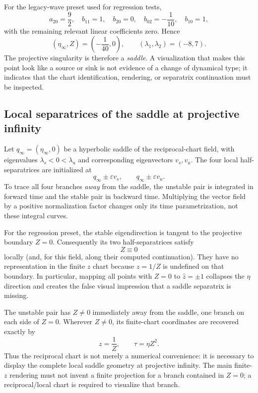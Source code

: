For the legacy-wave preset used for regression tests,
\[
a_{20}=\frac92,\quad b_{11}=1,\quad b_{20}=0,\quad
b_{02}=-\frac1{10},\quad b_{10}=1,
\]
with the remaining relevant linear coefficients zero.  Hence
\[
\boxed{(\eta_\infty,Z)=\left(-\frac1{40},0\right)},
\qquad
\boxed{(\lambda_1,\lambda_2)=(-8,7)}.
\]
The projective singularity is therefore a \emph{saddle}.  A visualization
that makes this point look like a source or sink is not evidence of a
change of dynamical type; it indicates that the chart identification,
rendering, or separatrix continuation must be inspected.

\subsection{Local separatrices of the saddle at projective infinity}

Let $q_\infty=(\eta_\infty,0)$ be a hyperbolic saddle of the reciprocal-chart
field, with eigenvalues $\lambda_s<0<\lambda_u$ and corresponding eigenvectors
$v_s,v_u$.  The four local half-separatrices are initialized at
\[
q_\infty\pm\varepsilon v_s,
\qquad
q_\infty\pm\varepsilon v_u.
\]
To trace all four branches \emph{away} from the saddle, the unstable pair is
integrated in forward time and the stable pair in backward time.  Multiplying
the vector field by a positive normalization factor changes only its time
parametrization, not these integral curves.

For the regression preset, the stable eigendirection is tangent to the
projective boundary $Z=0$.  Consequently its two half-separatrices satisfy
\[
\boxed{Z\equiv0}
\]
locally (and, for this field, along their computed continuation).  They have
no representation in the finite $z$ chart because $z=1/Z$ is undefined on
that boundary.  In particular, mapping all points with $Z=0$ to
$\hat z=\pm1$ collapses the $\eta$ direction and creates the false visual
impression that a saddle separatrix is missing.

The unstable pair has $Z\neq0$ immediately away from the saddle, one branch
on each side of $Z=0$.  Wherever $Z\neq0$, its finite-chart coordinates are
recovered exactly by
\[
z=\frac1Z,
\qquad
\tau=\eta Z^2.
\]
Thus the reciprocal chart is not merely a numerical convenience: it is
necessary to display the complete local saddle geometry at projective
infinity.  The main finite-$z$ rendering must not invent a finite projection
for a branch contained in $Z=0$; a reciprocal/local chart is required to
visualize that branch.

